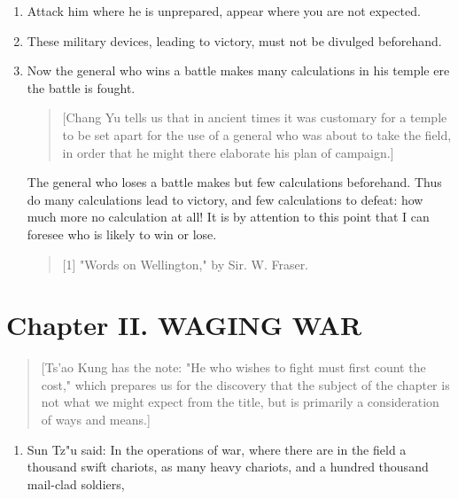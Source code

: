 \documentclass[10pt,a4paper]{book}
\begin{document}
\begin{enumerate}[leftmargin=*, label=\arabic*.,wide=0pt, resume]
{\small
\begin{quote}
[Less plausible is the interpretation favoured by most of the commentators: "If sovereign and subject are in accord, put division between them."]
\end{quote}
}

\item Attack him where he is unprepared, appear where you are not expected.

\item These military devices, leading to victory, must not be divulged beforehand.

\item Now the general who wins a battle makes many calculations in his temple ere the battle is fought.

{\small
\begin{quote}
[Chang Yu tells us that in ancient times it was customary for a temple to be set apart for the use of a general who was about to take the field, in order that he might there elaborate his plan of campaign.]
\end{quote}
}

The general who loses a battle makes but few calculations beforehand. Thus do many calculations lead to victory, and few calculations to defeat: how much more no calculation at all! It is by attention to this point that I can foresee who is likely to win or lose.

{\small
\begin{quote}
[1] "Words on Wellington," by Sir. W. Fraser.
\end{quote}
}

\end{enumerate}

\chapter{Chapter II. WAGING WAR}

\begin{quote}
[Ts'ao Kung has the note: "He who wishes to fight must first count the cost," which prepares us for the discovery that the subject of the chapter is not what we might expect from the title, but is primarily a consideration of ways and means.]
\end{quote}

\begin{enumerate}[leftmargin=*, label=\arabic*., start=1, wide=0pt]
\item Sun Tz"u said: In the operations of war, where there are in the field a thousand swift chariots, as many heavy chariots, and a hundred thousand mail-clad soldiers,
\end{enumerate}
\end{document}

